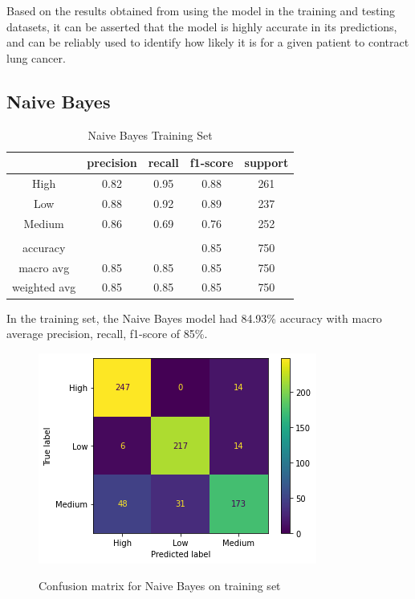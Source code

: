 \documentclass[runningheads]{llncs}
\begin{document}
Based on the results obtained from using the model in the training and testing datasets, it can be asserted that the model is highly accurate in its predictions, and can be reliably used to identify how likely it is for a given patient to contract lung cancer.
\newpage

\subsection{Naive Bayes}

\begin{table}[ht]
\centering
\caption{Naive Bayes Training Set} \vspace{0.25em}
\begin{tabular}{|c|c|c|c|c|} \hline
 & precision & recall & f1-score & support \\ \hline
High   & 0.82 & 0.95 & 0.88 & 261 \\ \hline
Low    & 0.88 & 0.92 & 0.89 & 237 \\ \hline
Medium & 0.86 & 0.69 & 0.76 & 252 \\ \hline
& & & & \\ \hline
accuracy     & & & 0.85 & 750 \\ \hline
macro avg    & 0.85 & 0.85 & 0.85 & 750 \\ \hline
weighted avg & 0.85 & 0.85 & 0.85 & 750 \\ \hline
\end{tabular}
\label{tab:naivebayes-training}
\end{table}

In the training set, the Naive Bayes model had 84.93\% accuracy with macro average precision, recall, f1-score of 85\%. 

\begin{figure}[ht]           	 
\centering               	 
\caption{Confusion matrix for Naive Bayes on training set}
\includegraphics[scale=0.5]{naivebayes-CM-training.png}  	 
\label{fig:naivebayes-CM-training}
\end{figure}
\end{document}

